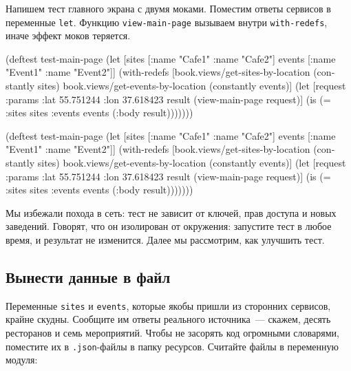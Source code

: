 Напишем тест главного экрана с двумя моками. Поместим ответы сервисов в
переменные \verb|let|. Функцию \verb|view-main-page| вызываем внутри
\verb|with-redefs|, иначе эффект моков теряется.

\ifx\DEVICETYPE\MOBILE

\begin{english}
  \begin{clojure}
(deftest test-main-page
  (let [sites [{:name "Cafe1"}
               {:name "Cafe2"}]
        events [{:name "Event1"}
                {:name "Event2"}]]
    (with-redefs
      [book.views/get-sites-by-location
       (constantly sites)
       book.views/get-events-by-location
       (constantly events)]
      (let [request
            {:params {:lat 55.751244
                      :lon 37.618423}}
            result
            (view-main-page request)]
        (is (= {:sites sites
               :events events}
               (:body result)))))))
  \end{clojure}
\end{english}

\else

\begin{english}
  \begin{clojure}
(deftest test-main-page
  (let [sites [{:name "Cafe1"} {:name "Cafe2"}]
        events [{:name "Event1"} {:name "Event2"}]]
    (with-redefs
      [book.views/get-sites-by-location (constantly sites)
       book.views/get-events-by-location (constantly events)]
      (let [request {:params {:lat 55.751244
                              :lon 37.618423}}
            result (view-main-page request)]
        (is (= {:sites sites :events events}
               (:body result)))))))
  \end{clojure}
\end{english}

\fi

Мы избежали похода в сеть: тест не зависит от ключей, прав доступа и новых
заведений. Говорят, что он изолирован от окружения: запустите тест в любое
время, и результат не изменится. Далее мы рассмотрим, как улучшить тест.

\subsection{Вынести данные в файл}

Переменные \verb|sites| и \verb|events|, которые якобы пришли из сторонних
сервисов, крайне скудны. Сообщите им ответы реального источника~--- скажем,
десять ресторанов и семь мероприятий. Чтобы не засорять код огромными словарями,
поместите их в \verb|.json|-файлы в папку ресурсов. Считайте файлы в переменную
модуля:

